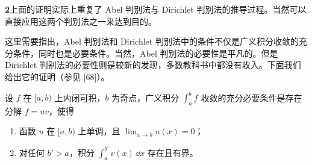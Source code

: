 \begin{xremark}
\textbf{2}\quad 上面的证明实际上重复了 Abel 判别法与 Dirichlet 判别法的推导过程。当然可以直接应用这两个判别法之一来达到目的。

这里需要指出，Abel 判别法和 Dirichlet 判别法中的条件不仅是广义积分收敛的充分条件，同时也是必要条件。当然，Abel 判别法的必要性是平凡的。但是 Dirichlet 判别法的必要性则是较新的发现，多数教科书中都没有收入。下面我们给出它的证明（参见 [68]）。
\end{xremark}

\begin{xproposition}
设 $f$ 在 $[a,b)$ 上内闭可积，$b$ 为奇点，广义积分 $\int_a^b f$ 收敛的充分必要条件是存在分解 $f=uv$，使得
\begin{enumerate}[label=(\arabic*)]
  \item 函数 $u$ 在 $[a,b)$ 上单调，且 $\lim_{x\to b}u(x)=0$；
  \item 对任何 $b'>a$，积分 $\int_a^{b'}v(x)\,\dd x$ 存在且有界。
\end{enumerate}
\end{xproposition}
